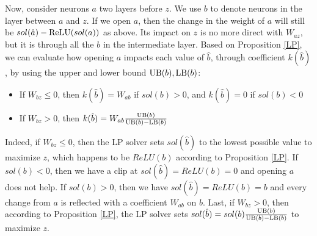 % 			

\medskip

Now, consider neurons $a$ two layers before $z$. We use $b$ to denote neurons in the layer between $a$ and $z$. If we open $a$, then the change in the weight of $a$ will still be $sol(\hat{a})-\mathrm{ReLU}(sol(a))$ as above. Its impact on $z$ is no more direct with $W_{az}$, but it is through all the $b$ in the intermediate layer. 
Based on Proposition \ref{LP}, we can evaluate how opening $a$ impacts each value of 
$\hat{b}$, through coefficient $k(\hat{b})$, by using the upper and lower bound
$\mathrm{UB}(b),\mathrm{LB}(b)$:
\begin{itemize}
 \item If $W_{bz}\leq0$, then $k(\hat{b})=W_{ab}$ if $sol(b) > 0$, and $k(\hat{b})=0$ if $sol(b) < 0$
 \item If $W_{bz}>0$, then $k(\hat{b})=W_{ab} \frac{\mathrm{UB}(b)}{\mathrm{UB}(b)-\mathrm{LB}(b)}$
\end{itemize}

Indeed, if $W_{bz}\leq0$, then the LP solver sets $sol(\hat{b})$ to the lowest possible value to maximize $z$, which happens to be $ReLU(b)$ according to Proposition \ref{LP}.
If $sol(b) < 0$, then we have a clip at $sol(\hat{b})=ReLU(b)=0$ and opening $a$ does not help. If $sol(b) > 0$, then we have $sol(\hat{b})=ReLU(b)=b$ and every change from 
$a$ is reflected with a coefficient $W_{ab}$ on $b$. 
Last, if $W_{bz}>0$, then according to Proposition \ref{LP}, the LP solver
sets $sol(\hat{b}) = sol(b) \frac{\mathrm{UB}(b)}{\mathrm{UB}(b)-\mathrm{LB}(b)}$ to maximize $z$.


